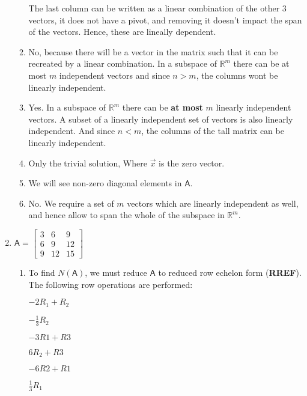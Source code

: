 \documentclass[a4paper, 11pt]{article}
\newcommand{\mat}[1]{\boldsymbol { \mathsf{#1}} }
\begin{document}
\begin{enumerate}
\begin{enumerate}[label=\alph*)]
The last column can be written as a linear combination of the other 3 vectors, it does not have a pivot, and removing it doesn't impact the span of the vectors. Hence, these are lineally dependent.


\item No, because there will be a vector in the matrix such that it can be recreated by a linear combination. In a subspace of $\mathds{R}^m$ there can be at most $m$ independent vectors and since $n > m$, the columns wont be linearly independent. 

\item Yes. In a subspace of $\mathds{R}^m$ there can be \textbf{at most} $m$ linearly independent vectors. A subset of a linearly independent set of vectors is also linearly independent. And since $n < m$, the columns of the tall matrix can be linearly independent.

\item  Only the trivial solution, Where $\vec x$ is the zero vector.

\item  We will see non-zero diagonal elements in $\mat A$.

\item No. We require a set of $m$ vectors which are linearly independent as well, and hence allow to span the whole of the subspace in $\mathds{R}^m$.


\end{enumerate}

\item $\mat A = \begin{bmatrix} 
    3 & 6 & 9 \\ 
    6 & 9 & 12 \\
    9 & 12 & 15 \end{bmatrix}$
    
     \begin{enumerate}[label=\alph*]
         \item To find $N(\mat A)$, we must reduce $\mat{A}$ to reduced row echelon form (\textbf{RREF}). The following row operations are performed:
         
         	\begin{center}
	$-2R_1 + R_2 $

	$-\frac{1}{3}R_2$

	$-3R1 + R3$

	$6R_2 + R3$

	$-6R2 + R1$

	$\frac{1}{3}R_1$


\end{center}
\end{enumerate}
\end{enumerate}
\end{document}
